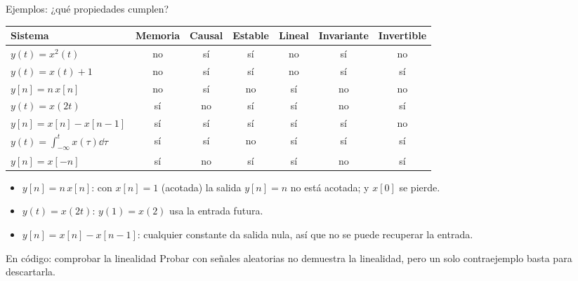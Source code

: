 \documentclass[aspectratio=169,11pt]{beamer}
\begin{document}
\begin{frame}{Ejemplos: ¿qué propiedades cumplen?}
  \begin{center}
    \small
    \renewcommand{\arraystretch}{1.3}
    \begin{tabular}{@{}lcccccc@{}}
      \toprule
      Sistema & Memoria & Causal & Estable & Lineal & Invariante & Invertible\\\midrule
      $y(t)=x^2(t)$ & no & sí & sí & no & sí & no\\
      $y(t)=x(t)+1$ & no & sí & sí & \alert{no} & sí & sí\\
      $y[n]=n\,x[n]$ & no & sí & \alert{no} & sí & \alert{no} & no\\
      $y(t)=x(2t)$ & sí & \alert{no} & sí & sí & \alert{no} & sí\\
      $y[n]=x[n]-x[n-1]$ & sí & sí & sí & sí & sí & no\\
      $y(t)=\int_{-\infty}^{t}x(\tau)\dd\tau$ & sí & sí & \alert{no} & sí & sí & sí\\
      $y[n]=x[-n]$ & sí & no & sí & sí & no & sí\\\bottomrule
    \end{tabular}
  \end{center}
  \begin{itemize}\footnotesize
    \item $y[n]=n\,x[n]$: con $x[n]=1$ (acotada) la salida $y[n]=n$ no está acotada; y $x[0]$ se pierde.
    \item $y(t)=x(2t)$: $y(1)=x(2)$ usa la entrada futura.
    \item $y[n]=x[n]-x[n-1]$: cualquier constante da salida nula, así que no se puede recuperar la entrada.
  \end{itemize}
\end{frame}

\begin{frame}{En código: comprobar la linealidad}
  Probar con señales aleatorias no demuestra la linealidad, pero un solo contraejemplo basta para descartarla.
  \medskip
\end{frame}
\end{document}
